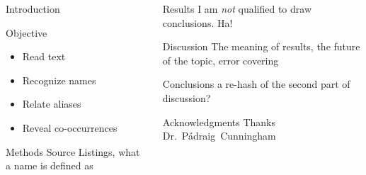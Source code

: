 \documentclass{beamer}
\begin{document}
\begin{frame}[t]{}
\begin{columns}
\begin{column}{.45\textwidth}
\begin{block}{Introduction}
      \end{block}


      \begin{block}{Objective}
        \begin{itemize}
        \item Read text
        \item Recognize names
        \item Relate aliases
        \item Reveal co-occurrences
        \end{itemize}
      \end{block}

      \begin{block}{Methods}
        Source Listings, what a name is defined as
      \end{block}
    \end{column}

    \begin{column}{.45\textwidth}
      \begin{block}{Results}
        I am \emph{not} qualified to draw conclusions.  Ha!
      \end{block}

      \begin{block}{Discussion} 
        The meaning of results, the future of the topic, error covering
      \end{block}

      \begin{block}{Conclusions}
        a re-hash of the second part of discussion?
      \end{block}

      \begin{block}{Acknowledgments}
        Thanks Dr.~P\'adraig~Cunningham
      \end{block}
    \end{column}
  \end{columns}
\end{frame}
\end{document}
